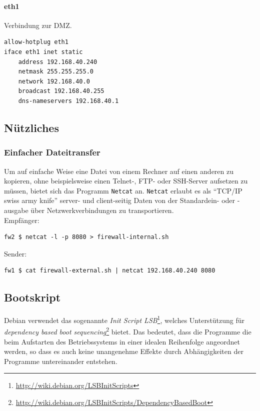 \paragraph{eth1} Verbindung zur DMZ.

\begin{lstlisting}[label=lst:fw2:eth1,caption={Netzwerkadapter eth1 Konfiguration.}]
allow-hotplug eth1
iface eth1 inet static
    address 192.168.40.240
    netmask 255.255.255.0
    network 192.168.40.0
    broadcast 192.168.40.255
    dns-nameservers 192.168.40.1
\end{lstlisting}


\subsection{Nützliches}

\subsubsection{Einfacher Dateitransfer}

Um auf einfache Weise eine Datei von einem Rechner auf einen anderen zu
kopieren, ohne beispielsweise einen Telnet-, FTP- oder SSH-Server aufsetzen zu
müssen, bietet sich das Programm {\tt Netcat} an.
{\tt Netcat} erlaubt es als "`TCP/IP swiss army knife"'
server- und client-seitig Daten von der Standardein- oder -ausgabe über
Netzwerkverbindungen zu transportieren.\\

\noindent Empfänger:
\begin{verbatim}
fw2 $ netcat -l -p 8080 > firewall-internal.sh
\end{verbatim}

\noindent Sender:
\begin{verbatim}
fw1 $ cat firewall-external.sh | netcat 192.168.40.240 8080
\end{verbatim}


\subsection{Bootskript}

Debian verwendet das sogenannte \emph{Init Script LSB}\footnote{
\url{http://wiki.debian.org/LSBInitScripts}}, welches Unterstützung
für \emph{dependency based boot sequencing}\footnote{
\url{http://wiki.debian.org/LSBInitScripts/DependencyBasedBoot}
} bietet. Das bedeutet, dass
die Programme die beim Aufstarten des Betriebssystems in einer idealen
Reihenfolge angeordnet werden, so dass es auch keine unangenehme Effekte
durch Abhängigkeiten der Programme untereinander entstehen.

